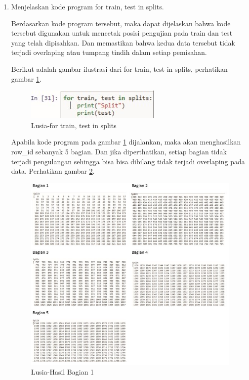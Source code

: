 \begin{enumerate}
\item Menjelaskan kode program for train, test in splits.
	
	
	\par Berdasarkan kode program tersebut, maka dapat dijelaskan bahwa kode tersebut digunakan untuk mencetak posisi pengujian pada train dan test yang telah dipisahkan. Dan memastikan bahwa kedua data tersebut tidak terjadi overlaping atau tumpang tindih dalam  setiap pemisahan.
	
	\par Berikut adalah gambar ilustrasi dari for train, test in splits, perhatikan gambar \ref{7A3a}.
	
		\begin{figure}[!hbtp]
		\centering
		\includegraphics[scale=0.4]{figures/v3a.jpg}
		\caption{Lusia-for train, test in splits}
		\label{7A3a}
		\end{figure}
		
	\par Apabila kode program pada gambar \ref{7A3a} dijalankan, maka akan menghasilkan row\_id sebanyak 5 bagian. Dan jika diperthatikan, setiap bagian tidak terjadi pengulangan sehingga bisa bisa dibilang tidak terjadi overlaping pada data. Perhatikan gambar \ref{7A3b}.
		\begin{figure}[!hbtp]
		\centering
		\includegraphics[scale=0.3]{figures/v3b.jpg}
		\caption{Lusia-Hasil Bagian 1}
		\label{7A3b}
		\end{figure}


\end{enumerate}
